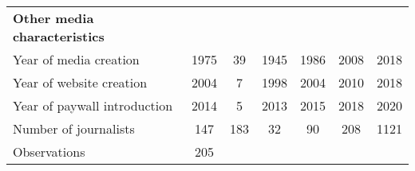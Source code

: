 {\begin{tabular}{l*{1}{cccccc}}
\textbf{Other media characteristics}&            &            &            &            &            &            \\
Year of media creation&        1975&          39&        1945&        1986&        2008&        2018\\
Year of website creation&        2004&           7&        1998&        2004&        2010&        2018\\
Year of paywall introduction&        2014&           5&        2013&        2015&        2018&        2020\\
Number of journalists&         147&         183&          32&          90&         208&        1121\\
\hline
Observations        &         205&            &            &            &            &            \\
\hline\hline
\end{tabular}
}
